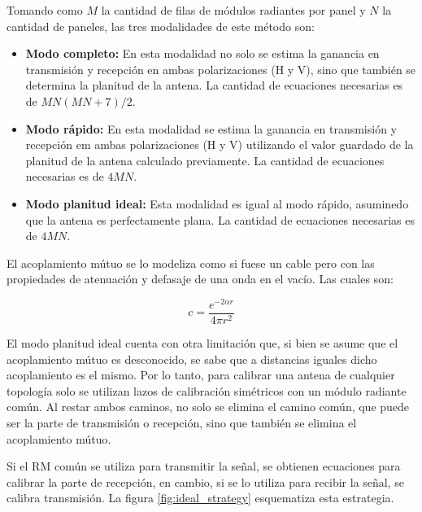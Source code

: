Tomando como $M$ la cantidad de filas de módulos radiantes por panel y $N$ la cantidad de paneles, las tres modalidades de 
este método son:

\begin{itemize}
	\item \textbf{Modo completo:} En esta modalidad no solo se estima la ganancia en transmisión y recepción en ambas 
		polarizaciones (H y V), sino que también se determina la planitud de la antena. La cantidad de ecuaciones necesarias es 
		de $MN(MN + 7)/2$.
	\item \textbf{Modo rápido:} En esta modalidad se estima la ganancia en transmisión y recepción em ambas polarizaciones
		(H y V) utilizando el valor guardado de la planitud de la antena calculado previamente. La cantidad de ecuaciones necesarias
		es de $4MN$.
	\item \textbf{Modo planitud ideal:} Esta modalidad es igual al modo rápido, asuminedo que la antena es perfectamente plana. 
		La cantidad de ecuaciones necesarias es de $4MN$.
\end{itemize}

El acoplamiento mútuo se lo modeliza como si fuese un cable pero con las propiedades de atenuación y defasaje de una onda en
el vacío. Las cuales son:

\begin{equation}
	c = \dfrac{e^{-2\alpha r}}{4\pi r^2}
\end{equation}

El modo planitud ideal cuenta con otra limitación que, si bien se asume que el acoplamiento mútuo es desconocido, se sabe que 
a distancias iguales dicho acoplamiento es el mismo. Por lo tanto, para calibrar una antena de cualquier topología solo se 
utilizan lazos de calibración simétricos con un módulo radiante común. Al restar ambos caminos, no solo se elimina el 
camino común, que puede ser la parte de transmisión o recepción, sino que también se elimina el acoplamiento mútuo.

Si el RM común se utiliza para transmitir la señal, se obtienen ecuaciones para calibrar la parte de recepción, en cambio, 
si se lo utiliza para recibir la señal, se calibra transmisión. La figura \ref{fig:ideal_strategy} esquematiza esta estrategia.

